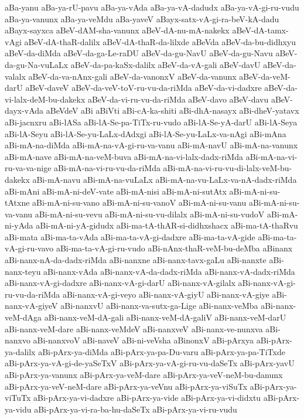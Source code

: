 {aBa-yanu
aBa-ya-rU-pavu
aBa-ya-vAda
aBa-ya-vA-dadudx
aBa-ya-vA-gi-ru-vudu
aBa-ya-vanunx
aBa-ya-veMdu
aBa-yaveV
aBayx-satx-vA-gi-ra-beV-kA-dadu
aBayx-sayxca
aBeV-dAM-sha-vanunx
aBeV-dA-nu-mA-nakekx
aBeV-dA-tamx-vAgi
aBeV-dA-thaR-dalilx
aBeV-dA-thaR-da-lilxde
aBeVda
aBeV-da-bu-didhxyu
aBeV-da-diMda
aBeV-da-ga-Le-raDU
aBeV-da-gu-NavU
aBeV-da-gu-Navu
aBeV-da-gu-Na-vuLaLx
aBeV-da-pa-kaSx-dalilx
aBeV-da-vA-gali
aBeV-davU
aBeV-da-valalx
aBeV-da-va-nAnx-gali
aBeV-da-vanonxV
aBeV-da-vanunx
aBeV-da-veM-darU
aBeV-daveV
aBeV-da-veV-toV-ru-vu-da-riMda
aBeV-da-vi-dadxre
aBeV-da-vi-lalx-deM-bu-dakekx
aBeV-da-vi-ru-vu-da-riMda
aBeV-davo
aBeV-davu
aBeV-dayx-vAda
aBeVdeV
aBi
aBiVti
aBi-cA-ka-shiti
aBi-dhA-nasayx
aBi-dheV-yatavx
aBi-jacnxru
aBi-lASa
aBi-lA-Se-pa-TiTx-ru-vudo
aBi-lA-Se-yA-darU
aBi-lA-Seya
aBi-lA-Seyu
aBi-lA-Se-yu-LaLx-dAdxgi
aBi-lA-Se-yu-LaLx-va-nAgi
aBi-mAna
aBi-mA-na-diMda
aBi-mA-na-vA-gi-ru-va-vanu
aBi-mA-navU
aBi-mA-na-vanunx
aBi-mA-nave
aBi-mA-na-veM-buva
aBi-mA-na-vi-lalx-dadx-riMda
aBi-mA-na-vi-ru-va-va-nige
aBi-mA-na-vi-ru-vu-da-riMda
aBi-mA-na-vi-ru-vu-di-lalx-veM-bu-dakekx
aBi-mA-navu
aBi-mA-na-vuLaLx
aBi-mA-na-vu-LaLx-va-nA-dadx-riMda
aBi-mAni
aBi-mA-ni-deV-vate
aBi-mA-nisi
aBi-mA-ni-sutAtx
aBi-mA-ni-su-tAtxne
aBi-mA-ni-su-vano
aBi-mA-ni-su-vanoV
aBi-mA-ni-su-vanu
aBi-mA-ni-su-va-vanu
aBi-mA-ni-su-vevu
aBi-mA-ni-su-vu-dilalx
aBi-mA-ni-su-vudoV
aBi-mA-ni-yAda
aBi-mA-ni-yA-gidudx
aBi-ma-tA-thAR-si-didhxshacx
aBi-ma-tA-thaRvu
aBi-mata
aBi-ma-ta-vAda
aBi-ma-ta-vA-gi-dadxre
aBi-ma-ta-vA-gide
aBi-ma-ta-vA-gi-ru-vavo
aBi-ma-ta-vA-gi-ru-vudo
aBi-nAnx-thaR-veM-bu-deMba
aBinanx
aBi-nanx-nA-da-dadx-riMda
aBi-nanxne
aBi-nanx-tavx-gaLu
aBi-nanxte
aBi-nanx-teyu
aBi-nanx-vAda
aBi-nanx-vA-da-dadx-riMda
aBi-nanx-vA-dadx-riMda
aBi-nanx-vA-gi-dadxre
aBi-nanx-vA-gi-darU
aBi-nanx-vA-gilalx
aBi-nanx-vA-gi-ru-vu-da-riMda
aBi-nanx-vA-gi-veyo
aBi-nanx-vA-giyU
aBi-nanx-vA-giye
aBi-nanx-vA-giyeV
aBi-nanxvU
aBi-nanx-va-sutx-ga-Lige
aBi-nanx-veMba
aBi-nanx-veM-dAga
aBi-nanx-veM-dA-gali
aBi-nanx-veM-dA-galiV
aBi-nanx-veM-darU
aBi-nanx-veM-dare
aBi-nanx-veMdeV
aBi-nanxveV
aBi-nanx-ve-nunxva
aBi-nanxvo
aBi-nanxvoV
aBi-naveV
aBi-ni-veVsha
aBinonxV
aBi-pArxya
aBi-pArx-ya-dalilx
aBi-pArx-ya-diMda
aBi-pArx-ya-pa-Du-varu
aBi-pArx-ya-pa-TiTxde
aBi-pArx-ya-vA-gi-de-yaSeTxV
aBi-pArx-ya-vA-gi-ru-vu-daSeTx
aBi-pArx-yavU
aBi-pArx-ya-vanunx
aBi-pArx-ya-veM-dare
aBi-pArx-ya-veV-neM-bu-danunx
aBi-pArx-ya-veV-neM-dare
aBi-pArx-ya-veVnu
aBi-pArx-ya-viSuTx
aBi-pArx-ya-viTuTx
aBi-pArx-ya-vi-dadxre
aBi-pArx-ya-vide
aBi-pArx-ya-vi-didxtu
aBi-pArx-ya-vidu
aBi-pArx-ya-vi-ra-ba-hu-daSeTx
aBi-pArx-ya-vi-ru-vudu
}
